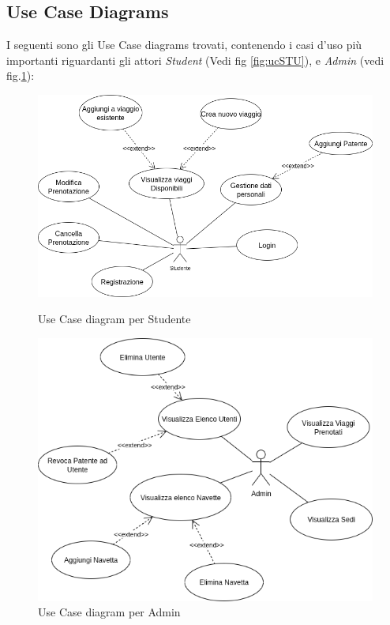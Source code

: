 \subsection{Use Case Diagrams}
I seguenti sono gli Use Case diagrams trovati, contenendo i casi d'uso più importanti riguardanti gli attori \textit{Student} (Vedi fig \ref{fig:ucSTU}), e \textit{Admin} (vedi fig.\ref{fig:ucADM}):
\begin{figure}[H]
    \centering
    \includegraphics[width=1.2\linewidth]{Images/Student UC.png}
    \caption{Use Case diagram per Studente}
    \label{fig:ucSTU}

    \vspace{0.5cm}

    \centering
    \includegraphics[width=1\linewidth]{Images/Admin UC.png}
    \caption{Use Case diagram per Admin}
    \label{fig:ucADM}
\end{figure}
